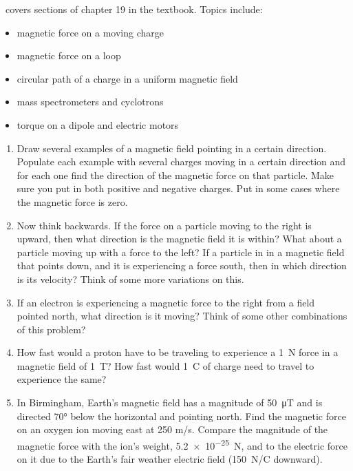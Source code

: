 \week \ covers sections of chapter 19 in the textbook. Topics include:

\begin{itemize}
	\item magnetic force on a moving charge
	\item magnetic force on a loop
	\item circular path of a charge in a uniform magnetic field
	\item mass spectrometers and cyclotrons
	\item torque on a dipole and electric motors
\end{itemize}

\begin{enumerate}
\setlength\itemsep{3 in}

\item
Draw several examples of a magnetic field pointing in a certain direction. Populate each example with several charges moving in a certain direction and for each one find the direction of the magnetic force on that particle. Make sure you put in both positive and negative charges. Put in some cases where the magnetic force is zero. 

\clearpage

\item
Now think backwards. If the force on a particle moving to the right is upward, then what direction is the magnetic field it is within? What about a particle moving up with a force to the left? If a particle in in a magnetic field that points down, and it is experiencing a force south, then in which direction is its velocity? Think of some more variations on this.

\item
If an electron is experiencing a magnetic force to the right from a field pointed north, what direction is it moving? Think of some other combinations of this problem?

\item
How fast would a proton have to be traveling to experience a \SI{1}{\newton} force in a magnetic field of \SI{1}{\tesla}? How fast would \SI{1}{\coulomb} of charge need to travel to experience the same?

\item
In Birmingham, Earth's magnetic field has a magnitude of \SI{50}{\micro\tesla} and is directed \ang{70} below the horizontal and pointing north. Find the magnetic force on an oxygen ion moving east at 250 m/s. Compare the magnitude of the magnetic force with the ion's weight, \SI{5.2e-25}{\newton}, and to the electric force on it due to the Earth's fair weather electric field (\SI{150}{N/C} downward).


\end{enumerate}
